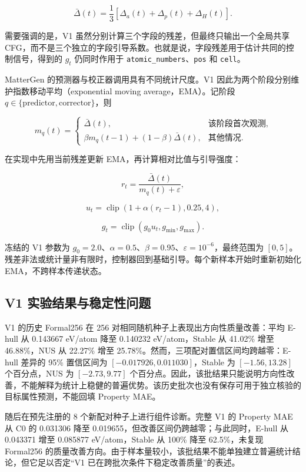\[
\bar\Delta(t)=\frac{1}{3}
\left[\Delta_a(t)+\Delta_p(t)+\Delta_H(t)\right].
\]

需要强调的是，V1 虽然分别计算三个字段的残差，但最终只输出一个全局共享 CFG，而不是三个独立的字段引导系数。也就是说，字段残差用于估计共同的控制信号，得到的 \(g_t\) 仍同时作用于 \texttt{atomic\_numbers}、\texttt{pos} 和 \texttt{cell}。

MatterGen 的预测器与校正器调用具有不同统计尺度。V1 因此为两个阶段分别维护指数移动平均（exponential moving average，EMA）。记阶段 \(q\in\{\mathrm{predictor},\mathrm{corrector}\}\)，则

\[
m_q(t)=
\begin{cases}
\bar\Delta(t), & \text{该阶段首次观测},\\
\beta m_q(t-1)+(1-\beta)\bar\Delta(t), & \text{其他情况}.
\end{cases}
\]

在实现中先用当前残差更新 EMA，再计算相对比值与引导强度：

\[
r_t=\frac{\bar\Delta(t)}{m_q(t)+\varepsilon},
\]

\[
u_t=\operatorname{clip}\left(1+\alpha(r_t-1),0.25,4\right),
\]

\[
g_t=\operatorname{clip}\left(g_0u_t,g_{\min},g_{\max}\right).
\]

冻结的 V1 参数为 \(g_0=2.0\)、\(\alpha=0.5\)、\(\beta=0.95\)、\(\varepsilon=10^{-6}\)，最终范围为 \([0,5]\)。残差非法或统计量非有限时，控制器回到基础引导。每个新样本开始时重新初始化 EMA，不跨样本传递状态。

\subsection{V1 实验结果与稳定性问题}

V1 的历史 Formal256 在 256 对相同随机种子上表现出方向性质量改善：平均 E-hull 从 0.143667 eV/atom 降至 0.140232 eV/atom，Stable 从 41.02\% 增至 46.88\%，NUS 从 22.27\% 增至 25.78\%。然而，三项配对置信区间均跨越零：E-hull 差异的 95\% 置信区间为 \([-0.017926,0.011030]\)，Stable 为 \([-1.56,13.28]\) 个百分点，NUS 为 \([-2.73,9.77]\) 个百分点。因此，该批结果只能说明方向性改善，不能解释为统计上稳健的普遍优势。该历史批次也没有保存可用于独立核验的目标属性预测，不能回填 Property MAE。

随后在预先注册的 8 个新配对种子上进行组件诊断。完整 V1 的 Property MAE 从 C0 的 0.031306 降至 0.019655，但改善区间仍跨越零；与此同时，E-hull 从 0.043371 增至 0.085877 eV/atom，Stable 从 100\% 降至 62.5\%，未复现 Formal256 的质量改善方向。由于样本量较小，该批结果不能单独建立普遍统计结论，但它足以否定``V1 已在跨批次条件下稳定改善质量''的表述。

